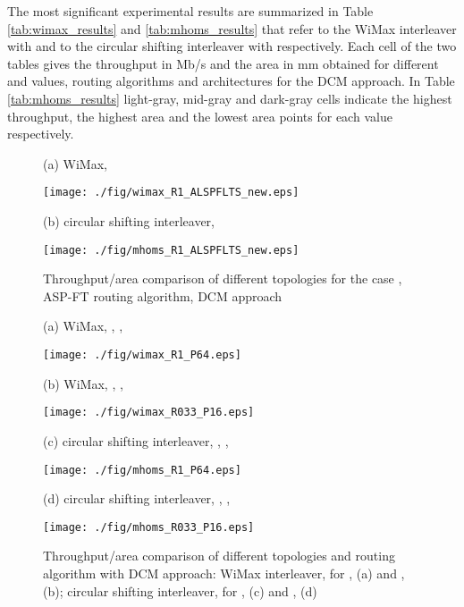 \documentclass[10pt,twocolumn,journal]{IEEEtran}
\begin{document}
The most significant experimental results are summarized in Table \ref{tab:wimax_results} and \ref{tab:mhoms_results} that
refer to the WiMax interleaver with  and to the circular shifting interleaver with  respectively. 
Each cell of the two tables gives the throughput in Mb/s and the area in mm obtained for different 
 and  values, routing algorithms and architectures for the DCM approach. In Table \ref{tab:mhoms_results} light-gray, mid-gray and dark-gray cells indicate 
the highest throughput, the highest area and the lowest area points for each  value respectively.
\begin{figure*}
  \begin{minipage}[b]{.50\linewidth}
    \centering
    \centerline{\scriptsize{(a) WiMax, }} 
   \centerline{
      \texttt{[image: ./fig/wimax\_R1\_ALSPFLTS\_new.eps]}
    } \medskip
    \end{minipage}
  \hfill
  \begin{minipage}[b]{.50\linewidth}
    \centering
    \centerline{\scriptsize{(b) circular shifting interleaver, }} 
    \centerline{
      \texttt{[image: ./fig/mhoms\_R1\_ALSPFLTS\_new.eps]}
    } \medskip
  \end{minipage}
\caption{Throughput/area comparison of different topologies for the case , ASP-FT routing algorithm, DCM 
approach} \label{fig:R1_ASP-FT}
\end{figure*}
\begin{figure*}
\begin{minipage}[b]{.50\linewidth}
    \centering
    \centerline{\scriptsize{(a) WiMax, , , }} 
   \centerline{
      \texttt{[image: ./fig/wimax\_R1\_P64.eps]}
    } \medskip
    \end{minipage}
  \hfill
  \begin{minipage}[b]{.50\linewidth}
    \centering
    \centerline{\scriptsize{(b) WiMax, , , }} 
    \centerline{
      \texttt{[image: ./fig/wimax\_R033\_P16.eps]}
    } \medskip
  \end{minipage}
\begin{minipage}[b]{.50\linewidth}
    \centering
    \centerline{\scriptsize{(c) circular shifting interleaver, , , }} 
   \centerline{
      \texttt{[image: ./fig/mhoms\_R1\_P64.eps]}
    } \medskip
    \end{minipage}
  \hfill
  \begin{minipage}[b]{.50\linewidth}
    \centering
    \centerline{\scriptsize{(d) circular shifting interleaver, , , }} 
    \centerline{
      \texttt{[image: ./fig/mhoms\_R033\_P16.eps]}
    } \medskip
  \end{minipage}
\caption{Throughput/area comparison of different topologies and routing algorithm with DCM approach: 
WiMax interleaver,  for ,  (a) and ,  (b); circular shifting interleaver, 
 for ,  (c) and ,  (d)}
\label{fig:tar_tot}
\end{figure*}
\end{document}
